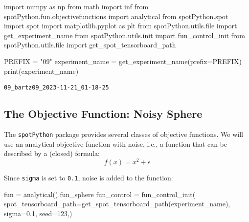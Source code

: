 \documentclass[
  letterpaper,
  DIV=11,
  numbers=noendperiod]{scrreprt}
\newenvironment{Shaded}{\begin{snugshade}}{\end{snugshade}}
\newcommand{\BuiltInTok}[1]{\textcolor[rgb]{0.00,0.23,0.31}{#1}}
\newcommand{\DecValTok}[1]{\textcolor[rgb]{0.68,0.00,0.00}{#1}}
\newcommand{\FloatTok}[1]{\textcolor[rgb]{0.68,0.00,0.00}{#1}}
\newcommand{\ImportTok}[1]{\textcolor[rgb]{0.00,0.46,0.62}{#1}}
\newcommand{\NormalTok}[1]{\textcolor[rgb]{0.00,0.23,0.31}{#1}}
\newcommand{\OperatorTok}[1]{\textcolor[rgb]{0.37,0.37,0.37}{#1}}
\newcommand{\StringTok}[1]{\textcolor[rgb]{0.13,0.47,0.30}{#1}}
\begin{document}
\begin{Shaded}
\begin{Highlighting}[]
\ImportTok{import}\NormalTok{ numpy }\ImportTok{as}\NormalTok{ np}
\ImportTok{from}\NormalTok{ math }\ImportTok{import}\NormalTok{ inf}
\ImportTok{from}\NormalTok{ spotPython.fun.objectivefunctions }\ImportTok{import}\NormalTok{ analytical}
\ImportTok{from}\NormalTok{ spotPython.spot }\ImportTok{import}\NormalTok{ spot}
\ImportTok{import}\NormalTok{ matplotlib.pyplot }\ImportTok{as}\NormalTok{ plt}
\ImportTok{from}\NormalTok{ spotPython.utils.}\BuiltInTok{file} \ImportTok{import}\NormalTok{ get\_experiment\_name}
\ImportTok{from}\NormalTok{ spotPython.utils.init }\ImportTok{import}\NormalTok{ fun\_control\_init}
\ImportTok{from}\NormalTok{ spotPython.utils.}\BuiltInTok{file} \ImportTok{import}\NormalTok{ get\_spot\_tensorboard\_path}

\NormalTok{PREFIX }\OperatorTok{=} \StringTok{"09"}
\NormalTok{experiment\_name }\OperatorTok{=}\NormalTok{ get\_experiment\_name(prefix}\OperatorTok{=}\NormalTok{PREFIX)}
\BuiltInTok{print}\NormalTok{(experiment\_name)}
\end{Highlighting}
\end{Shaded}

\begin{verbatim}
09_bartz09_2023-11-21_01-18-25
\end{verbatim}

\hypertarget{the-objective-function-noisy-sphere-1}{%
\subsection{The Objective Function: Noisy
Sphere}\label{the-objective-function-noisy-sphere-1}}

The \texttt{spotPython} package provides several classes of objective
functions. We will use an analytical objective function with noise,
i.e., a function that can be described by a (closed) formula:
\[f(x) = x^2 + \epsilon\]

Since \texttt{sigma} is set to \texttt{0.1}, noise is added to the
function:

\begin{Shaded}
\begin{Highlighting}[]
\NormalTok{fun }\OperatorTok{=}\NormalTok{ analytical().fun\_sphere}
\NormalTok{fun\_control }\OperatorTok{=}\NormalTok{ fun\_control\_init(}
\NormalTok{    spot\_tensorboard\_path}\OperatorTok{=}\NormalTok{get\_spot\_tensorboard\_path(experiment\_name),}
\NormalTok{    sigma}\OperatorTok{=}\FloatTok{0.1}\NormalTok{,}
\NormalTok{    seed}\OperatorTok{=}\DecValTok{123}\NormalTok{,)}
\end{Highlighting}
\end{Shaded}
\end{document}
